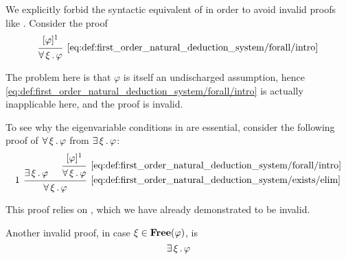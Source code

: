 \begin{example}\label{ex:def:first_order_natural_deduction_system/eigenvariables}
  \hfill
  \begin{thmenum}
     We explicitly forbid the syntactic equivalent of  in order to avoid invalid proofs like . Consider the proof
    \begin{equation*}
      \begin{prooftree}
        \hypo{ [\varphi]^1 }
        \infer1[\ref{eq:def:first_order_natural_deduction_system/forall/intro}]{ \qforall \xi \varphi }
      \end{prooftree}
    \end{equation*}

    The problem here is that \( \varphi \) is itself an undischarged assumption, hence \eqref{eq:def:first_order_natural_deduction_system/forall/intro} is actually inapplicable here, and the proof is invalid.

     To see why the eigenvariable conditions in  are essential, consider the following proof of \( \forall \thinspace \xi \thinspace . \thinspace \varphi \) from \( \exists \thinspace \xi \thinspace . \thinspace \varphi \):
    \begin{equation*}
      \begin{prooftree}
        \hypo{ \qexists \xi \varphi }

        \hypo{ [\varphi]^1 }
        \infer1[\ref{eq:def:first_order_natural_deduction_system/forall/intro}]{ \qforall \xi \varphi }

        \infer[left label=\( 1 \)]2[\ref{eq:def:first_order_natural_deduction_system/exists/elim}]{ \qforall \xi \varphi }
      \end{prooftree}
    \end{equation*}

    This proof relies on , which we have already demonstrated to be invalid.

     Another invalid proof, in case \( \xi \in \operatorname{\mathbf{Free}}(\varphi) \), is
    \begin{equation*}
      \begin{prooftree}
        \hypo{ \qexists \xi \varphi }


\end{prooftree}
\end{equation*}
\end{thmenum}
\end{example}
